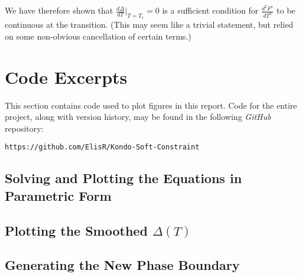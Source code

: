 We have therefore shown that $ \frac{d \Delta}{dT}\bigr|_{T=T_c} = 0 $ is a sufficient condition for $ \frac{d^2 F^{\star}}{d T^2} $ to be continuous at the transition. (This may seem like a trivial statement, but relied on some non-obvious cancellation of certain terms.)

\section{Code Excerpts}
\label{sec:code}

This section contains code used to plot figures in this report. Code for the entire project, along with version history, may be found in the following \textit{GitHub} repository:

\begin{center}
\texttt{https://github.com/ElisR/Kondo-Soft-Constraint}
\end{center}

\subsection{Solving and Plotting the Equations in Parametric Form}

\subsection{Plotting the Smoothed $ \Delta(T) $}

\subsection{Generating the New Phase Boundary}
